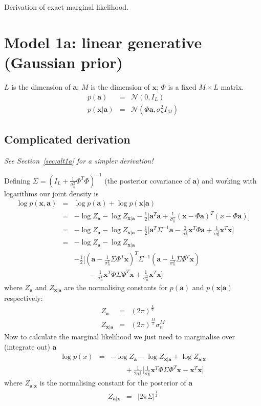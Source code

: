 \documentclass{article}
\newcommand{\ba}{\bm{a}}
\newcommand{\bx}{\bm{x}}
\newcommand{\fs}{\frac{1}{\sigma_n^2}}
\begin{document}
Derivation of exact marginal likelihood.


\section{Model 1a: linear generative (Gaussian prior)}


$L$ is the dimension of $\ba$; $M$ is the dimension of $\bx$; $\Phi$ is a fixed $M \times L$ matrix.
\begin{eqnarray}
  p(\ba) &=& \mathcal{N}(0, I_L) \\
  p(\bx|\ba) &=& \mathcal{N}(\Phi \ba, \sigma_n^2 I_M)
\end{eqnarray}

\subsection{Complicated derivation}

\emph{See Section~\ref{sec:alt1a} for a simpler derivation!}

Defining $\Sigma = (I_L + \fs \Phi^T\Phi)^{-1}$ (the posterior covariance of $\ba$) and working with
logarithms our joint density is
\begin{eqnarray}
  \log p(\bx, \ba)
    &=& \log p(\ba) + \log p(\bx|\ba) \\
    &=& - \log Z_{\ba}
        - \log Z_{\bx |\ba}
        - \frac{1}{2}\big[\ba^T\ba + \fs(\bx-\Phi\ba)^T(x-\Phi\ba)\big] \\
    &=& - \log Z_{\ba}
        - \log Z_{\bx |\ba}
        - \frac{1}{2}\big[\ba^T \Sigma^{-1} \ba - \frac{2}{\sigma_n^2}\bx^T\Phi\ba + \fs \bx^T \bx \big] \\
    &=& - \log Z_{\ba}
        - \log Z_{\bx |\ba} \nonumber \\
    &&  - \frac{1}{2}\big[(\ba - \fs \Sigma \Phi^T \bx)^T \Sigma^{-1} (\ba - \fs \Sigma \Phi^T \bx) \nonumber \\
    && \qquad             - \frac{1}{\sigma_n^4}\bx^T\Phi\Sigma\Phi^T\bx + \fs \bx^T \bx \big]
\end{eqnarray}
where $Z_{\ba}$ and $Z_{\bx |\ba}$ are the normalising constants for $p(\ba)$ and $p(\bx|\ba)$ respectively:
\begin{eqnarray}
  Z_{\ba} &=& (2 \pi)^{\frac{L}{2}} \\
  Z_{\bx |\ba} &=& (2 \pi)^{\frac{M}{2}} \sigma_n^M
\end{eqnarray}
Now to calculate the marginal likelihood we just need to marginalise over (integrate out) $\ba$
\begin{eqnarray}
  \log p(x)
    &=& - \log Z_{\ba}
        - \log Z_{\bx |\ba}
        + \log Z_{\ba |\bx} \nonumber \\
    && \qquad
        + \frac{1}{2 \sigma_n^2}\big[\fs\bx^T\Phi\Sigma\Phi^T\bx - \bx^T \bx \big]
\end{eqnarray}
where $Z_{\ba |\bx}$ is the normalising constant for the posterior of $\ba$
\begin{eqnarray}
  Z_{\ba |\bx} &=& |2 \pi \Sigma|^\frac{1}{2}
\end{eqnarray}
\end{document}
